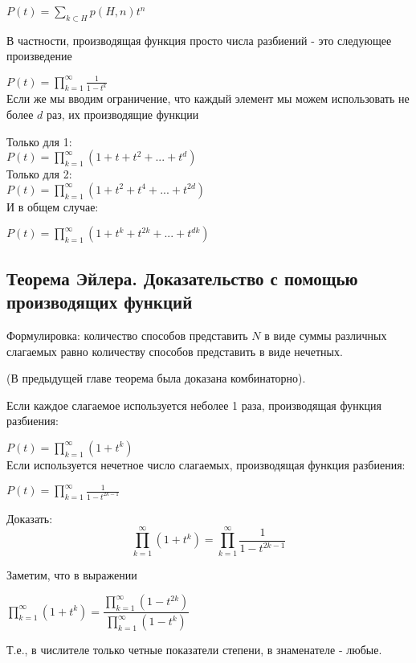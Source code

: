 $P(t) = \sum\limits_{k \subset H}^{} p(H,n)t^n $

В частности, производящая функция просто числа разбиений - это следующее произведение

$ P(t) = \prod\limits_{k=1}^{\infty} \frac{1}{1-t^k}$ \\

Если же мы вводим ограничение, что каждый элемент мы можем использовать не более $ d $ раз, их производящие функции

Только для 1:\\
$P(t) = \prod\limits_{k=1}^{\infty} ( 1 + t + t^{2} + ... + t^{d} )$ \\

Только для 2:\\
$P(t) = \prod\limits_{k=1}^{\infty} ( 1 + t^2 + t^{4} + ... + t^{2d} )$ \\

И в общем случае:

$P(t) = \prod\limits_{k=1}^{\infty} ( 1 + t^k + t^{2k} + ... + t^{dk} )$ \\

\subsection{Теорема Эйлера. Доказательство с помощью производящих функций}

Формулировка: количество способов представить $ N $ в виде суммы различных слагаемых равно количеству способов представить в виде нечетных.

(В предыдущей главе теорема была доказана комбинаторно).

Если каждое слагаемое используется неболее 1 раза, производящая функция разбиения:

$P(t) = \prod\limits_{k=1}^{\infty}  (1+t^k)$ \\

Если используется нечетное число слагаемых, производящая функция разбиения:

$ P(t) = \prod\limits_{k=1}^{\infty}  \frac{1}{1-t^{2k-1}} $

Доказать:
$$
\prod\limits_{k=1}^{\infty}  (1+t^k) = \prod\limits_{k=1}^{\infty}  \frac{1}{1-t^{2k-1}}
$$

Заметим, что в выражении

$ \prod\limits_{k=1}^{\infty}  (1+t^k) =
\dfrac
{\prod\limits_{k=1}^{\infty} (1-t^{2k}) }
{\prod\limits_{k=1}^{\infty} (1-t^k) }$ 

Т.е., в числителе только четные показатели степени, в знаменателе - любые.

